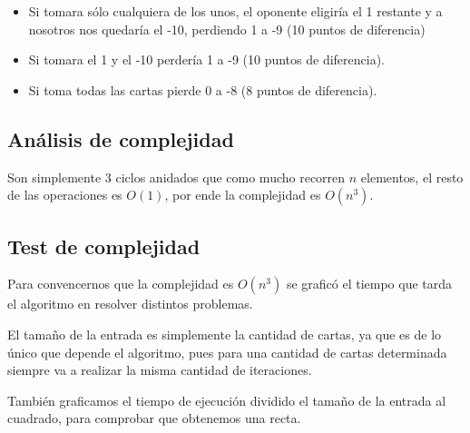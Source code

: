 \begin{itemize}
   \item Si tomara sólo cualquiera de los unos, el oponente eligiría el 1 restante y a nosotros nos quedaría el -10,
      perdiendo 1 a -9 (10 puntos de diferencia)
   \item Si tomara el 1 y el -10 perdería 1 a -9 (10 puntos de diferencia).
   \item Si toma todas las cartas pierde 0 a -8 (8 puntos de diferencia).
\end{itemize}

\subsection{An\'alisis de complejidad}
Son simplemente 3 ciclos anidados que como mucho recorren $n$ elementos, el resto de las operaciones es $O(1)$, por
ende la complejidad es $O(n^3)$.

\subsection{Test de complejidad}
Para convencernos que la complejidad es $O(n^3)$ se graficó el tiempo que tarda el algoritmo en resolver distintos problemas.

El tamaño de la entrada es simplemente la cantidad de cartas, ya que es de lo único que depende el algoritmo, pues para una cantidad de
cartas determinada siempre va a realizar la misma cantidad de iteraciones.

También graficamos el tiempo de ejecución dividido el tamaño de la entrada al cuadrado, para comprobar que obtenemos una recta.

